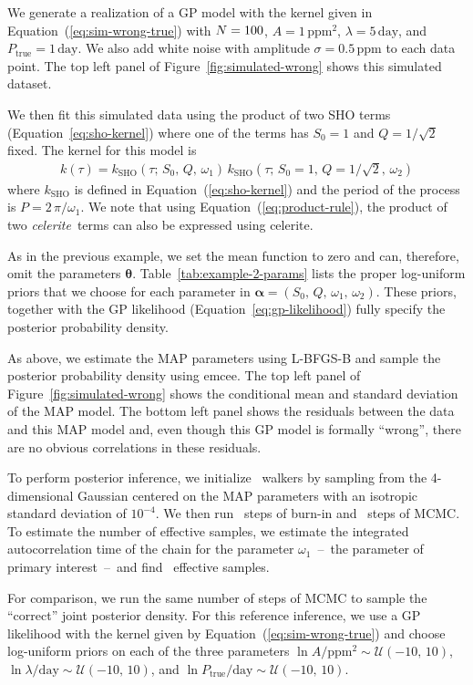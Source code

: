 \documentclass[manuscript, letterpaper]{aastex6}
\newcommand{\project}[1]{\textsf{#1}}
\newcommand{\celerite}{\project{celerite}}
\newcommand{\celeriteterm}{\emph{celerite}}
\newcommand{\emcee}{\project{emcee}}
\newcommand{\figureref}[1]{\ref{fig:#1}}
\newcommand{\Figure}[1]{Figure~\figureref{#1}}
\renewcommand{\eqref}[1]{\ref{eq:#1}}
\newcommand{\Eq}[1]{Equation~(\eqref{#1})}
\newcommand{\eq}[1]{\Eq{#1}}
\newcommand{\eqalt}[1]{Equation~\eqref{#1}}
\newcommand{\bvec}[1]{{\ensuremath{\boldsymbol{#1}}}}
\newcommand{\response}[1]{{\color{blue}#1}}
\begin{document}
\response{We generate a realization of a GP model with the kernel given in
\eq{sim-wrong-true} with $N = 100$, $A = 1\,\mathrm{ppm}^2$,
$\lambda = 5\,\mathrm{day}$, and $P_\mathrm{true} = 1\,\mathrm{day}$.
We also add white noise with amplitude $\sigma = 0.5\,\mathrm{ppm}$ to each
data point.
The top left panel of \Figure{simulated-wrong} shows this simulated dataset.

We then fit this simulated data using the product of two SHO terms
(\eqalt{sho-kernel}) where one of the terms has $S_0 = 1$ and $Q =
1/\sqrt{2}$ fixed.
The kernel for this model is
\begin{eqnarray}
k(\tau) = k_\mathrm{SHO}(\tau;\,S_0,\,Q,\,\omega_1) \,
    k_\mathrm{SHO}(\tau;\,S_0 = 1,\,Q = 1/\sqrt{2},\,\omega_2)
\end{eqnarray}
where $k_\mathrm{SHO}$ is defined in \eq{sho-kernel} and the period of the
process is $P=2\,\pi/\omega_1$.
We note that using \eq{product-rule}, the product of two \celeriteterm\ terms
can also be expressed using \celerite.

As in the previous example, we set the mean function to zero and can,
therefore, omit the parameters $\bvec{\theta}$.
Table~\ref{tab:example-2-params} lists the proper log-uniform priors that we
choose for each parameter in $\bvec{\alpha} =
(S_0,\,Q,\,\omega_1,\,\omega_2)$.
These priors, together with the GP likelihood (\eqalt{gp-likelihood}) fully
specify the posterior probability density.

As above, we estimate the MAP parameters using \project{L-BFGS-B} and sample
the posterior probability density using \emcee.
The top left panel of \Figure{simulated-wrong} shows the conditional mean and
standard deviation of the MAP model.
The bottom left panel shows the residuals between the data and this MAP model
and, even though this GP model is formally ``wrong'', there are no obvious
correlations in these residuals.

To perform posterior inference, we initialize \exampleiinwalkers~walkers by
sampling from the 4-dimensional Gaussian centered on the MAP parameters with
an isotropic standard deviation of $10^{-4}$.
We then run \exampleiinburn~steps of burn-in and \exampleiinsteps~steps of
MCMC.
To estimate the number of effective samples, we estimate the integrated
autocorrelation time of the chain for the parameter $\omega_1$~--~the
parameter of primary interest~--~and find \exampleiineff~effective samples.

For comparison, we run the same number of steps of MCMC to sample the
``correct'' joint posterior density.
For this reference inference, we use a GP likelihood with the kernel given by
\eq{sim-wrong-true} and choose log-uniform priors on each of the
three parameters $\ln A/\mathrm{ppm}^2 \sim \mathcal{U}(-10,\,10)$,
$\ln \lambda/\mathrm{day} \sim \mathcal{U}(-10,\,10)$, and
$\ln P_\mathrm{true}/\mathrm{day} \sim \mathcal{U}(-10,\,10)$.

}
\end{document}
